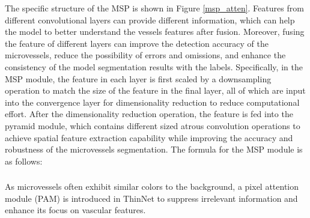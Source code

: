 \documentclass[a4paper,fleqn]{cas-dc}
\begin{document}
The specific structure of the MSP is shown in Figure \ref{msp_atten}. Features from different convolutional layers can provide different information, which can help the model to better understand the vessels features after fusion. Moreover, fusing the feature of different layers can improve the detection accuracy of the microvessels, reduce the possibility of errors and omissions, and enhance the consistency of the model segmentation results with the labels. Specifically, in the MSP module, the feature in each layer is first scaled by a downsampling operation to match the size of the feature in the final layer, all of which are input into the convergence layer for dimensionality reduction to reduce computational effort. After the dimensionality reduction operation, the feature is fed into the pyramid module, which contains different sized atrous convolution operations to achieve spatial feature extraction capability while improving the accuracy and robustness of the microvessels segmentation. The formula for the MSP module is as follows:



  

\subsubsection{}
As microvessels often exhibit similar colors to the background, a pixel attention module (PAM) is introduced in ThinNet to suppress irrelevant information and enhance its focus on vascular features. 
\end{document}
